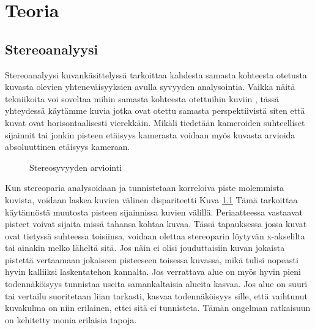 \chapter{Teoria}%
\label{ch:teoria}

\section{Stereoanalyysi}

Stereoanalyysi kuvankäsittelyssä tarkoittaa kahdesta samasta kohteesta otetusta kuvasta olevien yhteneväisyyksien avulla syvyyden analysointia.
Vaikka näitä tekniikoita voi soveltaa mihin samasta kohteesta otettuihin kuviin \cite{SumiYasushi20023ORi},
tässä yhteydessä käytämme kuvia jotka ovat otettu samasta perspektiivistä siten että kuvat ovat horisontaalisesti vierekkäin.
Mikäli tiedetään kameroiden suhteelliset sijainnit tai jonkin pisteen etäisyys kamerasta voidaan myös kuvasta arvioida absoluuttinen etäisyys kameraan. 

\begin{figure}[h]
\centering
{}
\caption{Stereosyvyyden arviointi}
\label{fig:stereo}
\end{figure}
    
Kun stereoparia analysoidaan ja tunnistetaan korreloiva piste molemmista kuvista,
voidaan laskea kuvien välinen dispariteetti Kuva \ref{fig:stereo}
Tämä tarkoittaa käytännöstä muutosta pisteen sijainnissa kuvien välillä.
Periaatteessa vastaavat pisteet voivat sijaita missä tahansa kohtaa kuvaa.
Tässä tapauksessa jossa kuvat ovat tietyssä suhteessa toisiinsa,
voidaan olettaa stereoparin löytyvän x-akselilta tai ainakin melko läheltä sitä.
Jos näin ei olisi jouduttaisiin kuvan jokaista pistettä vertaamaan jokaiseen pisteeseen toisessa kuvassa, 
mikä tulisi nopeasti hyvin kalliiksi laskentatehon kannalta.
Jos verrattava alue on myös hyvin pieni todennäköisyys tunnistaa useita samankaltaisia alueita kasvaa.
Jos alue on suuri tai vertailu suoritetaan liian tarkasti,
kasvaa todennäköisyys sille, että vaihtunut kuvakulma on niin erilainen, ettei sitä ei tunnisteta.
Tämän ongelman ratkaisuun on kehitetty monia erilaisia tapoja.


